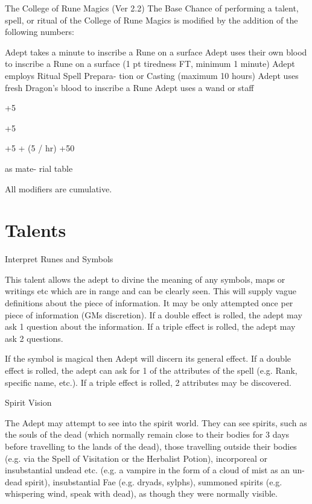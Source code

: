 \begin{Chapter}{The College of Rune Magics (Ver 2.2)}
The Base Chance of performing a talent, spell, or ritual of the
College of Rune Magics is modified by the addition of the following
numbers:

Adept takes a minute to inscribe a 
Rune on a surface 
Adept uses their own blood to inscribe 
a Rune on a surface (1 pt tiredness FT, 
minimum 1 minute) 
Adept employs Ritual Spell Prepara-
tion or Casting (maximum 10 hours) 
Adept uses fresh Dragon’s blood to 
inscribe a Rune 
Adept uses a wand or staff 

+5 

+5 

+5  + (5 / 
hr) 
+50 

as mate-
rial table 

All modifiers are cumulative. 

\section{Talents}

\begin{talent}[T-1]{Interpret Runes and Symbols }

\begin{effects}
 This  talent  allows  the  adept  to  divine  the 
meaning  of  any  symbols,  maps  or  writings  etc 
which  are  in  range  and  can  be  clearly  seen.  This 
will  supply  vague  definitions  about  the  piece  of 
information.  It  may  be  only  attempted  once  per 
piece of information (GMs discretion).  If a double 
effect is rolled, the adept may ask 1 question about 
the information. If a triple effect is rolled, the adept 
may ask 2 questions. 

If the symbol is magical then Adept will discern its 
general effect. If a double effect is rolled, the adept 
can  ask  for  1  of  the  attributes  of  the  spell  (e.g. 
Rank,  specific  name,  etc.).  If  a  triple  effect  is 
rolled, 2 attributes may be discovered. 

\end{effects}
\end{talent}

\begin{talent}[T-2]{Spirit Vision }

\begin{effects}
 The  Adept  may  attempt  to  see  into  the 
spirit world. They can see spirits, such as the souls 
of  the  dead  (which  normally  remain  close  to  their 
bodies  for  3  days  before  travelling  to  the  lands  of 
the dead), those travelling outside their bodies (e.g. 
via the Spell of Visitation or the Herbalist Potion), 
incorporeal  or  insubstantial  undead  etc.  (e.g.  a 
vampire  in  the  form  of  a  cloud  of  mist  as  an  un-
dead spirit), insubstantial Fae (e.g. dryads, sylphs), 
summoned  spirits  (e.g.  whispering  wind,  speak 
with dead), as though they were normally visible. 


\end{effects}
\end{talent}
\end{Chapter}
